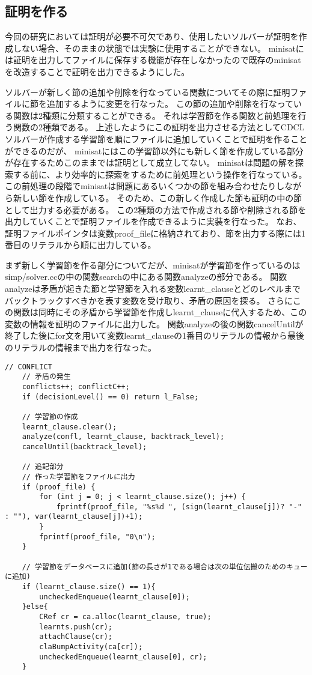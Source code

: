 \subsection{証明を作る}



今回の研究においては証明が必要不可欠であり、使用したいソルバーが証明を作成しない場合、そのままの状態では実験に使用することができない。
minisatには証明を出力してファイルに保存する機能が存在しなかったので既存のminisatを改造することで証明を出力できるようにした。

ソルバーが新しく節の追加や削除を行なっている関数についてその際に証明ファイルに節を追加するように変更を行なった。
この節の追加や削除を行なっている関数は2種類に分類することができる。
それは学習節を作る関数と前処理を行う関数の2種類である。
上述したようにこの証明を出力させる方法としてCDCLソルバーが作成する学習節を順にファイルに追加していくことで証明を作ることができるのだが、
minisatにはこの学習節以外にも新しく節を作成している部分が存在するためこのままでは証明として成立してない。
minisatは問題の解を探索する前に、より効率的に探索をするために前処理という操作を行なっている。
この前処理の段階でminisatは問題にあるいくつかの節を組み合わせたりしながら新しい節を作成している。
そのため、この新しく作成した節も証明の中の節として出力する必要がある。
この2種類の方法で作成される節や削除される節を出力していくことで証明ファイルを作成できるように実装を行なった。
なお、証明ファイルポインタは変数proof\_fileに格納されており、節を出力する際には1番目のリテラルから順に出力している。

まず新しく学習節を作る部分についてだが、minisatが学習節を作っているのはsimp/solver.ccの中の関数searchの中にある関数analyzeの部分である。
関数analyzeは矛盾が起きた節と学習節を入れる変数learnt\_clauseとどのレベルまでバックトラックすべきかを表す変数を受け取り、矛盾の原因を探る。
さらにこの関数は同時にその矛盾から学習節を作成しlearnt\_clauseに代入するため、この変数の情報を証明のファイルに出力した。
関数analyzeの後の関数cancelUntilが終了した後にfor文を用いて変数learnt\_clauseの1番目のリテラルの情報から最後のリテラルの情報まで出力を行なった。
\begin{lstlisting}[caption=関数analyzeの変更(core/solver.cc), firstnumber=296]
	// CONFLICT
	// 矛盾の発生
    conflicts++; conflictC++;
    if (decisionLevel() == 0) return l_False;

	// 学習節の作成
    learnt_clause.clear();
    analyze(confl, learnt_clause, backtrack_level);
    cancelUntil(backtrack_level);
    
	// 追記部分
	// 作った学習節をファイルに出力
    if (proof_file) {
        for (int j = 0; j < learnt_clause.size(); j++) {
			fprintf(proof_file, "%s%d ", (sign(learnt_clause[j])? "-" : ""), var(learnt_clause[j])+1); 
        }
        fprintf(proof_file, "0\n");
    }

	// 学習節をデータベースに追加(節の長さが1である場合は次の単位伝搬のためのキューに追加)
	if (learnt_clause.size() == 1){
        uncheckedEnqueue(learnt_clause[0]);
    }else{
        CRef cr = ca.alloc(learnt_clause, true);
        learnts.push(cr);
        attachClause(cr);
        claBumpActivity(ca[cr]);
        uncheckedEnqueue(learnt_clause[0], cr);
    }
\end{lstlisting}

